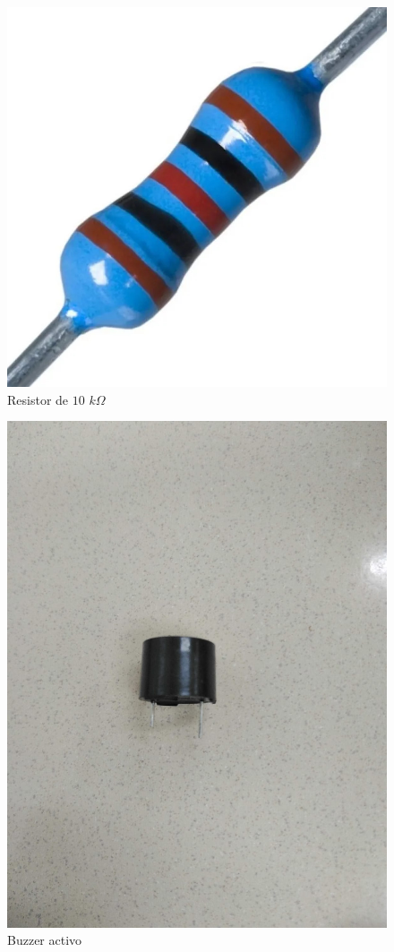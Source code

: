 \begin{figure}[H]
  \centering
  \includegraphics[scale = 0.1]{Imagenes/materiales/resistor_10k.jpg}
  \caption{Resistor de $10$ $k\Omega$}
\end{figure}

\begin{figure}[H]
  \centering
  \includegraphics[scale = 0.1]{Imagenes/materiales/buzzer_activo.jpg}
  \caption{Buzzer activo}
\end{figure}